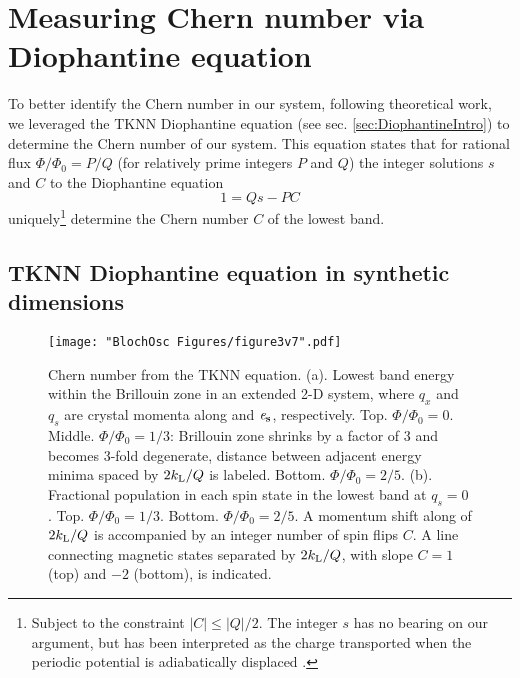 \section{Measuring Chern number via Diophantine equation}\label{sec:Diophantine}
To better identify the Chern number in our system, following theoretical work\cite{Huang2013,Liu2013,Wang2013,Zhang2016,Mugel2017}, we leveraged the TKNN Diophantine equation (see sec. \ref{sec:DiophantineIntro}) to determine the Chern number of our system. This equation states that for rational flux $\Phi/\Phi_0 = P/Q$ (for relatively prime integers $P$ and $Q$) the integer solutions  $s$ and $C$ to the Diophantine equation
\begin{equation}
1 = Q s - P C
\label{eqn:Diophantine}
\end{equation}  
uniquely\footnote{Subject to the constraint $|C|\leq |Q|/2$\cite{Thouless1982, Kohmoto1989}. The integer $s$ has no bearing on our argument, but has been interpreted as the charge transported when the periodic potential is adiabatically displaced \cite{MacDonald1983,Kunz1986}.} determine the Chern number $C$ of the lowest band.

\subsection{TKNN Diophantine equation in synthetic dimensions}

\begin{figure}
\texttt{[image: "BlochOsc Figures/figure3v7".pdf]}
\caption[Chern number from the TKNN equation ]{Chern number from the TKNN equation. (a). Lowest band energy within the Brillouin zone in an extended 2-D system, where $q_x$ and $q_s$ are crystal momenta along \ex and $\bf{\mathit{e}_s}$, respectively. Top. $\Phi/\Phi_0=0$. Middle. $\Phi/\Phi_0=1/3$: Brillouin zone shrinks by a factor of $3$ and becomes 3-fold degenerate, distance between adjacent energy minima spaced by $2k_{\rm L}/Q$ is labeled. Bottom. $\Phi/\Phi_0=2/5$. (b).  Fractional population in each spin state in the lowest band at $q_s=0$. Top. $\Phi/\Phi_0=1/3$. Bottom. $\Phi/\Phi_0=2/5$. A momentum shift along \ex of $2k_{\rm{L}}/Q$ is accompanied by an integer number of spin flips $C$. A line connecting magnetic states separated by $2k_{\rm L}/Q$, with slope $C=1$ (top) and $-2$ (bottom), is indicated. }
\label{fig:Diophantine}
\end{figure}

